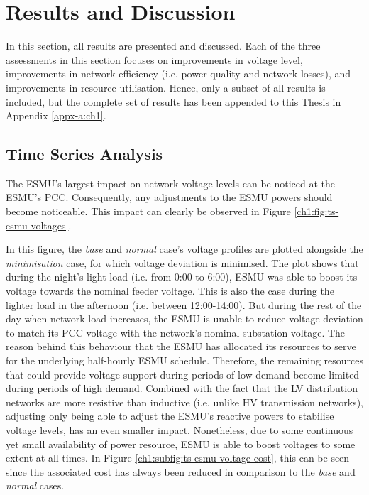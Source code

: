 \section{Results and Discussion}
\label{ch1:sec:results-and-discussion}

In this section, all results are presented and discussed.
Each of the three assessments in this section focuses on improvements in voltage level, improvements in network efficiency (i.e. power quality and network losses), and improvements in resource utilisation.
Hence, only a subset of all results is included, but the complete set of results has been appended to this Thesis in Appendix \ref{appx-a:ch1}.

\subsection{Time Series Analysis}
\label{ch1:subsec:time-series-analysis}

The ESMU's largest impact on network voltage levels can be noticed at the ESMU's PCC.
Consequently, any adjustments to the ESMU powers should become noticeable.
This impact can clearly be observed in Figure \ref{ch1:fig:ts-esmu-voltages}.



In this figure, the \textit{base} and \textit{normal} case's voltage profiles are plotted alongside the \textit{minimisation} case, for which voltage deviation is minimised.
The plot shows that during the night's light load (i.e. from 0:00 to 6:00), ESMU was able to boost its voltage towards the nominal feeder voltage.
This is also the case during the lighter load in the afternoon (i.e. between 12:00-14:00).
But during the rest of the day when network load increases, the ESMU is unable to reduce voltage deviation to match its PCC voltage with the network's nominal substation voltage.
The reason behind this behaviour that the ESMU has allocated its resources to serve for the underlying half-hourly ESMU schedule.
Therefore, the remaining resources that could provide voltage support during periods of low demand become limited during periods of high demand.
Combined with the fact that the LV distribution networks are more resistive than inductive (i.e. unlike HV transmission networks), adjusting only being able to adjust the ESMU's reactive powers to stabilise voltage levels, has an even smaller impact.
Nonetheless, due to some continuous yet small availability of power resource, ESMU is able to boost voltages to some extent at all times. In Figure \ref{ch1:subfig:ts-esmu-voltage-cost}, this can be seen since the associated cost has always been reduced in comparison to the \textit{base} and \textit{normal} cases.

